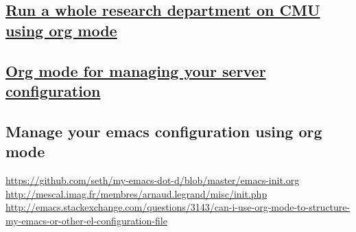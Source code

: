 \documentclass[11pt]{article}
\begin{document}
\subsection{\href{http://kitchingroup.cheme.cmu.edu/blog/2014/08/08/What-we-are-using-org-mode-for/}{Run a whole research department on CMU using org mode}}
\label{sec:orgheadline57}
\subsection{\href{http://www.howardism.org/Technical/Emacs/literate-devops.html}{Org mode for managing your server configuration}}
\label{sec:orgheadline58}
\subsection{Manage your emacs configuration using org mode}
\label{sec:orgheadline59}
\url{https://github.com/seth/my-emacs-dot-d/blob/master/emacs-init.org}
\url{http://mescal.imag.fr/membres/arnaud.legrand/misc/init.php}
\url{http://emacs.stackexchange.com/questions/3143/can-i-use-org-mode-to-structure-my-emacs-or-other-el-configuration-file}
\end{document}

